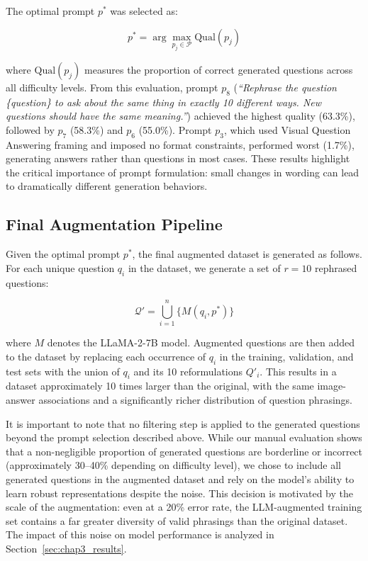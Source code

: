  
The optimal prompt $p^*$ was selected as:
 
\begin{equation}
    p^* = \arg\max_{p_j \in \mathcal{P}} \text{Qual}(p_j)
\end{equation}
 
where $\text{Qual}(p_j)$ measures the proportion of
correct generated questions across all difficulty levels.
From this evaluation, prompt $p_8$ (\textit{``Rephrase
the question \{question\} to ask about the same thing
in exactly 10 different ways. New questions should have
the same meaning.''}) achieved the highest quality
(63.3\%), followed by $p_7$ (58.3\%) and $p_6$ (55.0\%).
Prompt $p_3$, which used Visual Question Answering
framing and imposed no format constraints, performed
worst (1.7\%), generating answers rather than questions
in most cases. These results highlight the critical
importance of prompt formulation: small changes in
wording can lead to dramatically different generation
behaviors.
 
\subsection{Final Augmentation Pipeline}
\label{sec:chap3_pipeline}
 
Given the optimal prompt $p^*$, the final augmented
dataset is generated as follows. For each unique
question $q_i$ in the dataset, we generate a set of
$r = 10$ rephrased questions:
 
\begin{equation}
    \mathcal{Q}' = \bigcup_{i=1}^{n} \{M(q_i, p^*)\}
\end{equation}
 
where $M$ denotes the LLaMA-2-7B model. Augmented
questions are then added to the dataset by replacing
each occurrence of $q_i$ in the training, validation,
and test sets with the union of $q_i$ and its
10 reformulations $Q'_i$. This results in a dataset
approximately 10 times larger than the original,
with the same image-answer associations and a
significantly richer distribution of question phrasings.
 
 
It is important to note that no filtering step is
applied to the generated questions beyond the prompt
selection described above. While our manual evaluation
shows that a non-negligible proportion of generated
questions are borderline or incorrect (approximately
30--40\% depending on difficulty level), we chose to
include all generated questions in the augmented
dataset and rely on the model's ability to learn robust
representations despite the noise. This decision is
motivated by the scale of the augmentation: even at a
20\% error rate, the LLM-augmented training set
contains a far greater diversity of valid phrasings
than the original dataset. The impact of this noise
on model performance is analyzed in Section~\ref{sec:chap3_results}.

